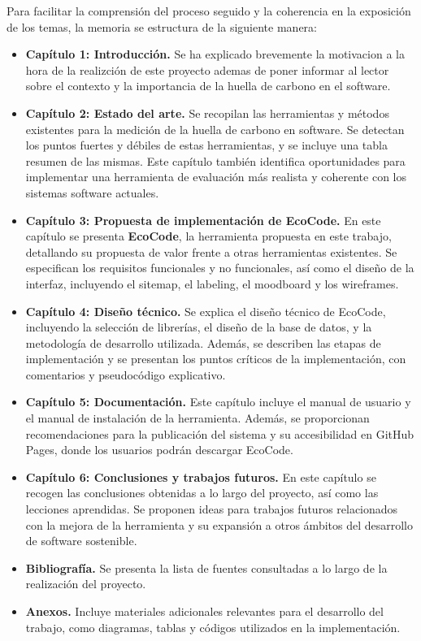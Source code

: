 \documentclass[12pt,a4paper]{report}
\begin{document}
Para facilitar la comprensión del proceso seguido y la coherencia en la
exposición de los temas, la memoria se estructura de la siguiente manera:

\begin{itemize}
  \item \textbf{Capítulo 1: Introducción.} Se ha explicado brevemente la motivacion a la hora de la realizción de este proyecto ademas de poner informar al lector sobre el contexto y la importancia de la huella
        de carbono en el software.
  \item \textbf{Capítulo 2: Estado del arte.} Se recopilan las herramientas y métodos existentes para la medición de la huella de carbono en software. Se detectan los puntos fuertes y débiles de estas herramientas, y se incluye una tabla resumen de las mismas. Este capítulo también identifica oportunidades para implementar una herramienta de evaluación más realista y coherente con los sistemas software actuales.
  \item \textbf{Capítulo 3: Propuesta de implementación de EcoCode.} En este capítulo se presenta \textbf{EcoCode}, la herramienta propuesta en este trabajo, detallando su propuesta de valor frente a otras herramientas existentes. Se especifican los requisitos funcionales y no funcionales, así como el diseño de la interfaz, incluyendo el sitemap, el labeling, el moodboard y los wireframes.
  \item \textbf{Capítulo 4: Diseño técnico.} Se explica el diseño técnico de EcoCode, incluyendo la selección de librerías, el diseño de la base de datos, y la metodología de desarrollo utilizada. Además, se describen las etapas de implementación y se presentan los puntos críticos de la implementación, con comentarios y pseudocódigo explicativo.
  \item \textbf{Capítulo 5: Documentación.} Este capítulo incluye el manual de usuario y el manual de instalación de la herramienta. Además, se proporcionan recomendaciones para la publicación del sistema y su accesibilidad en GitHub Pages, donde los usuarios podrán descargar EcoCode.
  \item \textbf{Capítulo 6: Conclusiones y trabajos futuros.} En este capítulo se recogen las conclusiones obtenidas a lo largo del proyecto, así como las lecciones aprendidas. Se proponen ideas para trabajos futuros relacionados con la mejora de la herramienta y su expansión a otros ámbitos del desarrollo de software sostenible.
  \item \textbf{Bibliografía.} Se presenta la lista de fuentes consultadas a lo largo de la realización del proyecto.
  \item \textbf{Anexos.} Incluye materiales adicionales relevantes para el desarrollo del trabajo, como diagramas, tablas y códigos utilizados en la implementación.
\end{itemize}
\end{document}
